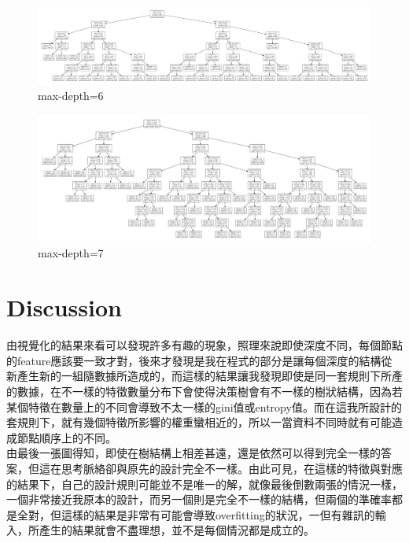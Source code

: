 \documentclass[8pt,a4paper]{article}
\begin{document}
\begin{figure}[H]
    \begin{center}
        \includegraphics[width=550pt]{decision_tree_depth_m2_6.png}
        \caption{max-depth=6}
    \end{center}
\end{figure}


\begin{figure}[H]
    \begin{center}
        \includegraphics[width=550pt]{decision_tree_depth_m2_7.png}
        \caption{max-depth=7}
        \label{fig:123}
    \end{center}
\end{figure}

\section*{Discussion}
\label{sec:Discussion)}

由視覺化的結果來看可以發現許多有趣的現象，照理來說即使深度不同，每個節點的feature應該要一致才對，後來才發現是我在程式的部分是讓每個深度的結構從新產生新的一組隨數據所造成的，而這樣的結果讓我發現即使是同一套規則下所產的數據，在不一樣的特徵數量分布下會使得決策樹會有不一樣的樹狀結構，因為若某個特徵在數量上的不同會導致不太一樣的gini值或entropy值。而在這我所設計的套規則下，就有幾個特徵所影響的權重蠻相近的，所以一當資料不同時就有可能造成節點順序上的不同。\\

由最後一張圖得知，即使在樹結構上相差甚遠，還是依然可以得到完全一樣的答案，但這在思考脈絡卻與原先的設計完全不一樣。由此可見，在這樣的特徵與對應的結果下，自己的設計規則可能並不是唯一的解，就像最後倒數兩張的情況一樣，一個非常接近我原本的設計，而另一個則是完全不一樣的結構，但兩個的準確率都是全對，但這樣的結果是非常有可能會導致overfitting的狀況，一但有雜訊的輸入，所產生的結果就會不盡理想，並不是每個情況都是成立的。\\



 \label{sec:references}
\end{document}
